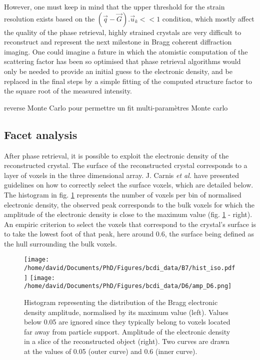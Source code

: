However, one must keep in mind that the upper threshold for the strain resolution exists based on the $(\vec{q}-\vec{G}).\vec{u}_k<<1$ condition, which mostly affect the quality of the phase retrieval, highly strained crystals are very difficult to reconstruct and represent the next milestone in Bragg coherent diffraction imaging.
One could imagine a future in which the atomistic computation of the scattering factor has been so optimised that phase retrieval algorithms would only be needed to provide an initial guess to the electronic density, and be replaced in the final steps by a simple fitting of the computed structure factor to the square root of the measured intensity.

\textcolor{Important}{reverse Monte Carlo pour permettre un fit multi-paramètres
 Monte carlo \parencite{RLMcGreevy_2001}}

\subsection{Facet analysis} \label{sec:FacetAnalysis}

After phase retrieval, it is possible to exploit the electronic density of the reconstructed crystal.
The surface of the reconstructed crystal corresponds to a layer of voxels in the three dimensional array.
J. Carnis \textit{et al.} \parencite*{Carnis2019} have presented guidelines on how to correctly select the surface voxels, which are detailed below.
The histogram in fig. \ref{fig:histo} represents the number of voxels per bin of normalised electronic density, the observed peak corresponds to the bulk voxels for which the amplitude of the electronic density is close to the maximum value (fig. \ref{fig:histo} - right).
An empiric criterion to select the voxels that correspond to the crystal's surface is to take the lowest foot of that peak, here around \num{0.6}, the surface being defined as the hull surrounding the bulk voxels.

\begin{figure}[!htb]
   \centering
   \texttt{[image: /home/david/Documents/PhD/Figures/bcdi\_data/B7/hist\_iso.pdf]}
   \texttt{[image: /home/david/Documents/PhD/Figures/bcdi\_data/D6/amp\_D6.png]}
   \caption{
   Histogram representing the distribution of the Bragg electronic density amplitude, normalised by its maximum value (left).
   Values below 0.05 are ignored since they typically belong to voxels located far away from particle support.
   Amplitude of the electronic density in a slice of the reconstructed object (right).
   Two curves are drawn at the values of \num{0.05} (outer curve) and \num{0.6} (inner curve).
   }
   \label{fig:histo}
\end{figure}

